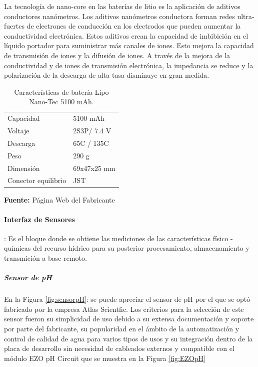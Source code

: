 La tecnolog\'ia de nano-core en las bater\'ias de litio es la aplicaci\'on de aditivos conductores nan\'ometros. Los aditivos nan\'ometros conductora forman redes ultra-fuertes de electrones de conducci\'on en los electrodos que pueden aumentar la conductividad electr\'onica.
Estos aditivos crean la capacidad de imbibici\'on en el l\'iquido portador para suministrar m\'as canales de iones. Esto mejora la capacidad de transmisi\'on de iones y la difusi\'on de iones. A trav\'es de la mejora de la conductividad y de iones de transmisi\'on electr\'onica, la impedancia se reduce y la polarizaci\'on de la descarga de alta tasa disminuye en gran medida.
\begin{table}[t]
\protect\caption[Caracter\'isticas de bater\'ia Lipo Nano-Tech ]{Caracter\'isticas de bater\'ia Lipo Nano-Tec 5100 mAh.}
\label{tab:caract_bat}
\begin{center}
\begin{tabular}{l l}
\hline
Capacidad    &  5100 mAh \\
Voltaje      &  2S3P/ 7.4 V \\
Descarga &  65C / 135C \\
Peso  & 290 g\\
Dimensi\'on   &  69x47x25 mm\\
Conector equilibrio	& JST\\
\hline
\end{tabular}
\vspace{5mm}
\newline
\hfill \textbf{Fuente:} P\'agina Web del Fabricante\cite{bateria}
\end{center}
\end{table}
\paragraph {Interfaz de Sensores}:
Es el bloque donde se obtiene las mediciones de las caracter\'isticas f\'isico - qu\'imicas del recurso h\'idrico para su posterior procesamiento, almacenamiento y transmici\'on a base remoto.
\subparagraph{Sensor de pH}
En la Figura \ref{fig:sensorpH}: se puede apreciar el sensor de pH por el que se optó fabricado por la empresa Atlas Scientfic.
Los criterios para la selección de este sensor fueron su simplicidad de uso debido a su extensa documentación y soporte por parte del fabricante, su popularidad en el ámbito de la automatización y control de calidad de agua para varios tipos de usos y su integración dentro de la placa de desarrollo sin necesidad de cableados externos y compatible con el módulo EZO pH Circuit que se muestra en la Figura \ref{fig:EZOpH}

